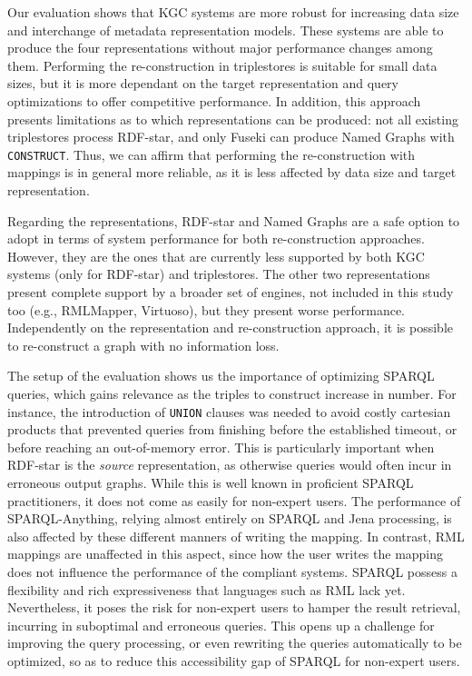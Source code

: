 Our evaluation shows that KGC systems are more robust for increasing data size and interchange of metadata representation models. These systems are able to produce the four representations without major performance changes among them. 
Performing the re-construction in triplestores is suitable for small data sizes, but it is more dependant on the target representation and query optimizations to offer competitive performance. 
In addition, this approach presents limitations as to which representations can be produced:
not all existing triplestores process RDF-star, and only Fuseki can produce Named Graphs with \texttt{CONSTRUCT}.
Thus, we can affirm that performing the re-construction with mappings is in general more reliable, as it is less affected by data size and target representation. 

Regarding the representations, RDF-star and Named Graphs are a safe option to adopt in terms of system performance for both re-construction approaches. However, they are the ones that are currently less supported by both KGC systems (only for RDF-star) and triplestores. The other two representations present complete support by a broader set of engines, not included in this study too (e.g., RMLMapper, Virtuoso), but they present worse performance. Independently on the representation and re-construction approach, it is possible to re-construct a graph with no information loss. 


The setup of the evaluation shows us the importance of optimizing SPARQL queries, which gains relevance as the triples to construct increase in number. For instance, the introduction of \texttt{UNION} clauses was needed to avoid costly cartesian products that prevented queries from finishing before the established timeout, or before reaching an out-of-memory error. This is particularly important when RDF-star is the \textit{source} representation, as otherwise queries would often incur in erroneous output graphs. While this is well known in proficient SPARQL practitioners, it does not come as easily for non-expert users. The performance of SPARQL-Anything, relying almost entirely on SPARQL and Jena processing, is also affected by these different manners of writing the mapping. In contrast, RML mappings are unaffected in this aspect, since how the user writes the mapping does not influence the performance of the compliant systems. SPARQL possess a flexibility and rich expressiveness that languages such as RML lack yet. Nevertheless, it poses the risk for non-expert users to hamper the result retrieval, incurring in suboptimal and erroneous queries. This opens up a challenge for improving the query processing, or even rewriting the queries automatically to be optimized, so as to reduce this accessibility gap of SPARQL for non-expert users.

